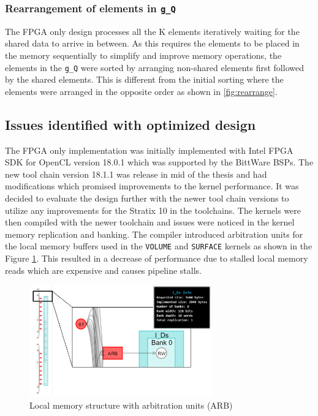\subsubsection*{Rearrangement of elements in \texttt{g\_Q}}

The FPGA only design processes all the K elements iteratively waiting
for the shared data to arrive in between. As this requires the elements
to be placed in the memory sequentially to simplify and improve memory
operations, the elements in the \texttt{g\_Q} were sorted by arranging
non-shared elements first followed by the shared elements. This is different
from the initial sorting where the elements were arranged in the opposite order
as shown in \ref{fig:rearrange}.

\subsection{Issues identified with optimized design}

The FPGA only implementation was initially implemented with Intel FPGA
SDK for OpenCL version 18.0.1 which was supported by the BittWare
BSPs. The new tool chain version 18.1.1 was release in mid of the thesis
and had modifications which promised improvements to the kernel performance.
It was decided to evaluate the design further with the newer tool chain versions to
utilize any improvements for the Stratix 10 in the toolchains.
The kernels were then compiled with the newer toolchain and issues
were noticed in the kernel memory replication and banking. The
compiler introduced arbitration units for the local memory
buffers used in the \texttt{VOLUME} and \texttt{SURFACE} kernels
as shown in the Figure \ref{fig:arb}. This resulted in a decrease
of performance due to stalled local memory reads which are expensive
and causes pipeline stalls.

\begin{figure}[ht]%
    \centering
    \includegraphics[width=0.7\textwidth]{images/arb}
    \caption{Local memory structure with arbitration units (ARB)}
    \label{fig:arb}
\end{figure}

